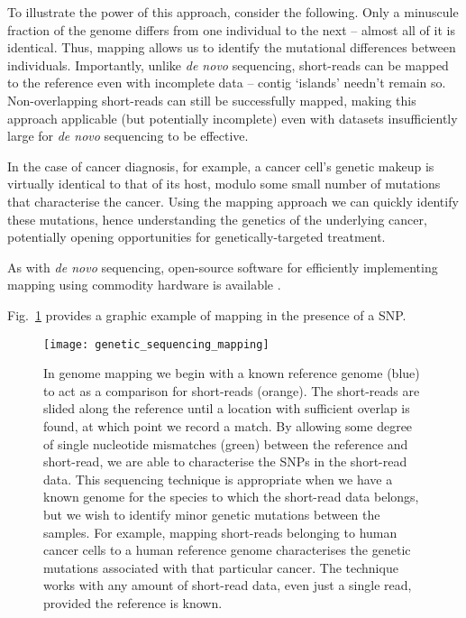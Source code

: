 To illustrate the power of this approach, consider the following. Only a minuscule fraction of the genome differs from one individual to the next -- almost all of it is identical. Thus, mapping allows us to identify the mutational differences between individuals. Importantly, unlike \textit{de novo} sequencing, short-reads can be mapped to the reference even with incomplete data -- contig `islands' needn't remain so. Non-overlapping short-reads can still be successfully mapped, making this approach applicable (but potentially incomplete) even with datasets insufficiently large for \textit{de novo} sequencing to be effective.

In the case of cancer diagnosis, for example, a cancer cell's genetic makeup is virtually identical to that of its host, modulo some small number of mutations that characterise the cancer. Using the mapping approach we can quickly identify these mutations, hence understanding the genetics of the underlying cancer, potentially opening opportunities for genetically-targeted treatment.

As with \textit{de novo} sequencing, open-source software for efficiently implementing mapping using commodity hardware is available \cite{Bfast etc}.

Fig.~\ref{fig:gen_seq_mapping} provides a graphic example of mapping in the presence of a SNP.

\begin{figure}[!htb]
	\texttt{[image: genetic\_sequencing\_mapping]}
	\caption{In genome mapping we begin with a known reference genome (blue) to act as a comparison for short-reads (orange). The short-reads are slided along the reference until a location with sufficient overlap is found, at which point we record a match. By allowing some degree of single nucleotide mismatches (green) between the reference and short-read, we are able to characterise the SNPs in the short-read data. This sequencing technique is appropriate when we have a known genome for the species to which the short-read data belongs, but we wish to identify minor genetic mutations between the samples. For example, mapping short-reads belonging to human cancer cells to a human reference genome characterises the genetic mutations associated with that particular cancer. The technique works with any amount of short-read data, even just a single read, provided the reference is known.} \label{fig:gen_seq_mapping}
\end{figure}

